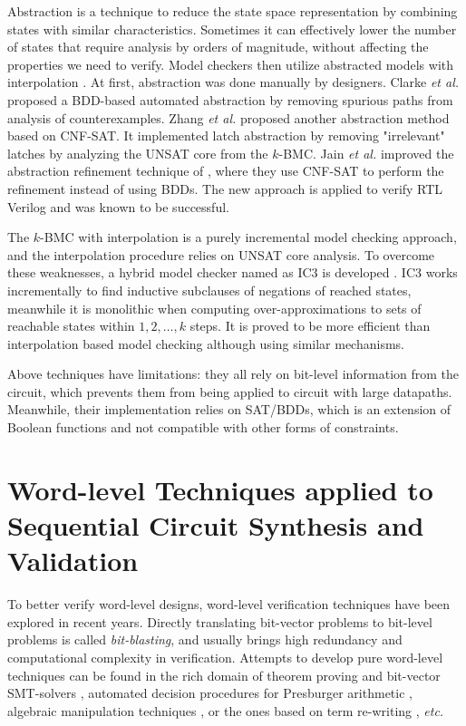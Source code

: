 Abstraction is a technique to reduce the state space representation by combining states with similar 
characteristics. Sometimes it can effectively lower the number of states that require analysis by orders of magnitude,
without affecting the properties we need to verify. Model checkers then utilize abstracted models 
with interpolation \cite{mcmillan2003interpolation,mcmillan:cav06}.
At first, abstraction was done manually by designers. Clarke {\it et al.} \cite{clarke2000counterexample}
proposed a BDD-based automated abstraction by removing spurious paths from analysis of counterexamples. 
Zhang {\it et al.} \cite{zhang2005design} proposed another abstraction method based on CNF-SAT.
It implemented latch abstraction by removing "irrelevant" latches by analyzing the 
UNSAT core from the $k$-BMC. Jain {\it et al.} \cite{HimanshuDAC2005} improved the abstraction refinement technique of \cite{clarke2000counterexample},
where they use CNF-SAT to perform the refinement instead of using BDDs. The new approach is applied to verify RTL Verilog
and was known to be successful.

The $k$-BMC with interpolation is a purely incremental model checking approach, and the interpolation procedure relies
on UNSAT core analysis. To overcome these weaknesses, a hybrid model checker named as IC3 is developed 
\cite{bradley2011sat,bradley2011incremental}. IC3 works incrementally to find inductive subclauses
of negations of reached states, meanwhile it is monolithic when computing over-approximations to sets of reachable
states within $1,2,\dots,k$ steps. It is proved to be more efficient than interpolation based model checking
although using similar mechanisms.

Above techniques have limitations: they all rely on bit-level information from 
the circuit, which prevents them from being applied to circuit with large datapaths.
Meanwhile, their implementation relies on SAT/BDDs, which is an extension of Boolean 
functions and not compatible with other forms of constraints.

\section{Word-level Techniques applied to Sequential Circuit Synthesis and Validation}
To better verify word-level designs, word-level verification techniques have been 
explored in recent years. Directly translating bit-vector problems to bit-level 
problems is called {\it bit-blasting}, and usually brings high redundancy and computational complexity in verification.
Attempts to develop pure word-level techniques can be found in
the rich domain of 
theorem proving \cite{arditi:bmd} and bit-vector SMT-solvers
\cite{boolector,cvc3,z3,bitvector98}, automated
decision procedures for Presburger arithmetic \cite{presburger,bultan:mixed_verification}, 
algebraic manipulation techniques 
\cite{devadas:algebraic_manipulation_iccd91}, or the ones based on
term re-writing \cite{AST}, {\it etc.}

